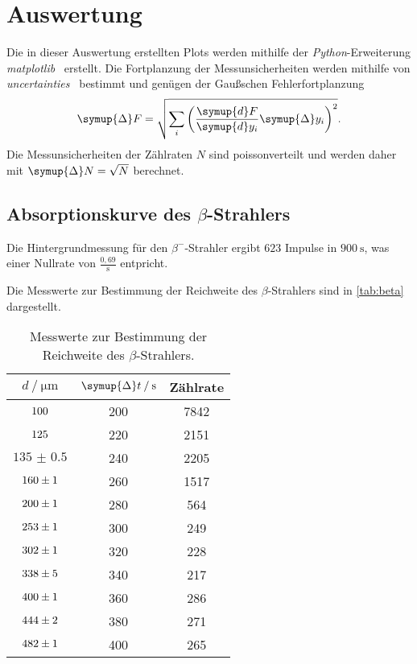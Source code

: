 \section{Auswertung}
\label{sec:Auswertung}
Die in dieser Auswertung erstellten Plots werden mithilfe der \textit{Python}-Erweiterung 
\textit{matplotlib}~\cite{matplotlib} erstellt. Die Fortplanzung der Messunsicherheiten werden mithilfe von
\textit{uncertainties}~\cite{uncertainties} bestimmt und genügen der Gaußschen Fehlerfortplanzung
\begin{equation*}
    \symup{\Delta} F = \sqrt{\sum_{i}\left(\frac{\symup{d}F}{\symup{d}y_{i}}\symup{\Delta} y_{i} \right)^2}.
\end{equation*}
Die Messunsicherheiten der Zählraten $N$ sind poissonverteilt und werden daher mit $\symup{\Delta}N = \sqrt{N}$ berechnet.


\subsection{\texorpdfstring{Absorptionskurve des $\beta$-Strahlers}{Absorptionskurve des Beta-Strahlers}}
\label{sec:beta}
Die Hintergrundmessung für den $\beta^{-}$-Strahler ergibt $\num{623}$ Impulse in $\qty{900}{\second}$, was 
einer Nullrate von $\frac{0,69}{\unit{\second}}$ entpricht.

Die Messwerte zur Bestimmung der Reichweite des $\beta$-Strahlers sind in \autoref{tab:beta} dargestellt.

\begin{table} [H]
    \centering
    \caption{Messwerte zur Bestimmung der Reichweite des $\beta$-Strahlers.}
    \label{tab:beta}
    \begin{tabular}{S S S}
      \toprule
      {$d \mathbin{/} \unit{\micro\metre}$} & {$\symup{\Delta} t \mathbin{/} \unit{\second}$} & {Zählrate} \\
      \midrule
      $\num{100(0  )}$ &  200 & 7842 \\
      $\num{125(0  )}$ &  220 & 2151 \\
      $\num{135(0.5)}$ &  240 & 2205 \\
      $\num{160(1  )}$ &  260 & 1517 \\
      $\num{200(1  )}$ &  280 & 564  \\
      $\num{253(1  )}$ &  300 & 249  \\
      $\num{302(1  )}$ &  320 & 228  \\
      $\num{338(5  )}$ &  340 & 217  \\
      $\num{400(1  )}$ &  360 & 286  \\
      $\num{444(2  )}$ &  380 & 271  \\
      $\num{482(1  )}$ &  400 & 265  \\  
      \bottomrule
    \end{tabular}
\end{table}

